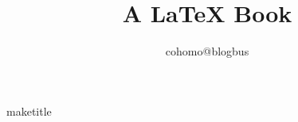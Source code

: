 \documentclass{book}
\begin{document}
\title{A LaTeX Book}

\author{cohomo@blogbus}

\date{}maketitle






\end{document}
